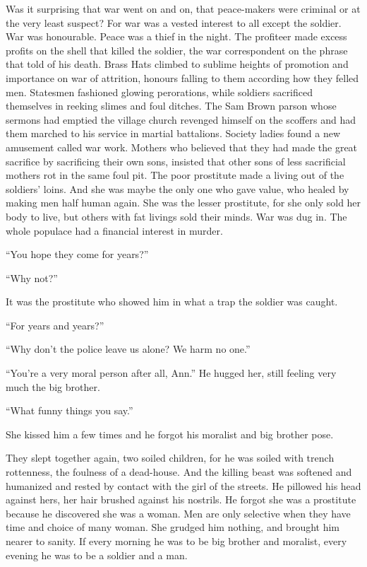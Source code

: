 Was it surprising that war went on and on, that peace-makers were criminal or at the very least suspect? For war was a vested interest to all except the soldier. War was honourable. Peace was a thief in the night. The profiteer made excess profits on the shell that killed the soldier, the war correspondent on the phrase that told of his death. Brass Hats climbed to sublime heights of promotion and importance on war of attrition, honours falling to them according how they felled men. Statesmen fashioned glowing perorations, while soldiers sacrificed themselves in reeking slimes and foul ditches. The Sam Brown parson whose sermons had emptied the village church revenged himself on the scoffers and had them marched to his service in martial battalions. Society ladies found a new amusement called war work. Mothers who believed that they had made the great sacrifice by sacrificing their own sons, insisted that other sons of less sacrificial mothers rot in the same foul pit. The poor prostitute made a living out of the soldiers' loins. And she was maybe the only one who gave value, who healed by making men half human again. She was the lesser prostitute, for she only sold her body to live, but others with fat livings sold their minds. War was dug in. The whole populace had a financial interest in murder.

``You hope they come for years?''

``Why not?''

It was the prostitute who showed him in what a trap the soldier was caught.

``For years and years?''

``Why don't the police leave us alone? We harm no one.''

``You're a very moral person after all, Ann.'' He hugged her, still feeling very much the big brother.

``What funny things you say.''

She kissed him a few times and he forgot his moralist and big brother pose.

They slept together again, two soiled children, for he was soiled with trench rottenness, the foulness of a dead-house. And the killing beast was softened and humanized and rested by contact with the girl of the streets. He pillowed his head against hers, her hair brushed against his nostrils. He forgot she was a prostitute because he discovered she was a woman. Men are only selective when they have time and choice of many woman. She grudged him nothing, and brought him nearer to sanity. If every morning he was to be big brother and moralist, every evening he was to be a soldier and a man.

